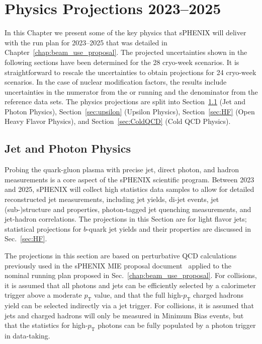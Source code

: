 \chapter{Physics Projections 2023--2025}
\label{chap:physics_projections}

In this Chapter we present some of the key physics that sPHENIX will
deliver with the run plan for 2023--2025 that was detailed in
Chapter~\ref{chap:beam_use_proposal}.  The projected uncertainties
shown in the following sections have been determined for the 28
cryo-week scenarios. It is straightforward to rescale the
uncertainties to obtain projections for 24 cryo-week scenarios.  In
the case of nuclear modification factors, the results include
uncertainties in the numerator from the \auau or \pau running and the
denominator from the \pp reference data sets.  The physics projections
are split into Section~\ref{sec:jet} (Jet and Photon Physics),
Section~\ref{sec:upsilon} (Upsilon Physics), Section~\ref{sec:HF}
(Open Heavy Flavor Physics), and Section~\ref{sec:ColdQCD} (Cold QCD
Physics).

\section{Jet and Photon Physics}
\label{sec:jet}

Probing the quark-gluon plasma with precise jet, direct photon, and
hadron measurements is a core aspect of the sPHENIX scientific
program. Between 2023 and 2025, sPHENIX will collect high statistics
data samples to allow for detailed reconstructed jet measurements,
including jet yields, di-jet events, jet (sub-)structure and
properties, photon-tagged jet quenching measurements, and jet-hadron
correlations.  The projections in this Section are for light flavor
jets; statistical projections for $b$-quark jet yields and their
properties are discussed in Sec.~\ref{sec:HF}.

The projections in this section are based on perturbative QCD
calculations previously used in the sPHENIX MIE proposal
document~\cite{Adare:2015kwa} applied to the nominal running plan
proposed in Sec.~\ref{chap:beam_use_proposal}.  For \pp collisions, it
is assumed that all photons and jets can be efficiently selected by a
calorimeter trigger above a moderate $p_\mathrm{T}$ value, and that
the full high-$p_\mathrm{T}$ charged hadrons yield can be selected
indirectly via a jet trigger. For \auau collisions, it is assumed that
jets and charged hadrons will only be measured in Minimum Bias events,
but that the statistics for high-$p_\mathrm{T}$ photons can be fully
populated by a photon trigger in \auau data-taking.

